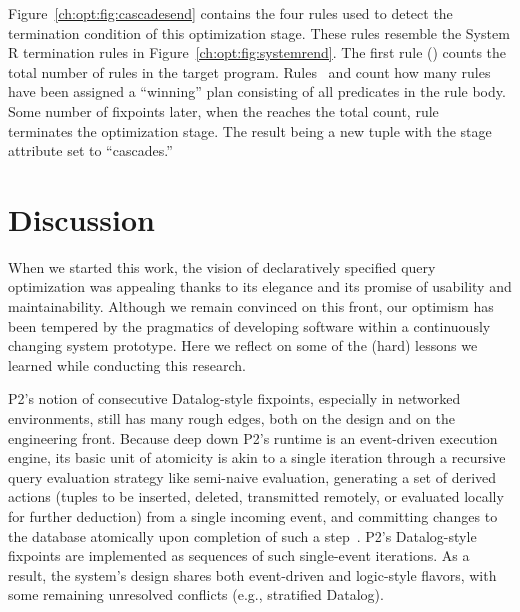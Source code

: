Figure~\ref{ch:opt:fig:cascadesend} contains the four rules used to detect the
termination condition of this optimization stage.  These rules resemble the
System R termination rules in Figure~\ref{ch:opt:fig:systemrend}.  The first
rule () counts the total number of rules in the target program.
Rules~ and  count how many rules have been assigned a
``winning'' plan consisting of all predicates in the rule body.  Some number of
fixpoints later, when the  reaches the total 
count, rule~ terminates the optimization stage.  The result being a
new  tuple with the stage attribute set to ``cascades.''

\section{Discussion}
\label{ch:opt:sec:discussion}

When we started this work, the vision of declaratively specified query
optimization was appealing thanks to its elegance and its promise of usability
and maintainability.  Although we remain convinced on this front, our optimism
has been tempered by the pragmatics of developing software within a
continuously changing system prototype.  Here we reflect on some of the (hard)
lessons we learned while conducting this research.

P2's notion of consecutive Datalog-style fixpoints, especially in networked
environments, still has many rough edges, both on the design and on the
engineering front.  Because deep down P2's runtime is an event-driven execution
engine, its basic unit of atomicity is akin to a single iteration through a
recursive query evaluation strategy like semi-naive evaluation, generating a
set of derived actions (tuples to be inserted, deleted, transmitted remotely,
or evaluated locally for further deduction) from a single incoming event, and
committing changes to the database atomically upon completion of such a
step~\cite{LuThesis}.  P2's Datalog-style fixpoints are implemented as
sequences of such single-event iterations.  As a result, the system's design
shares both event-driven and logic-style flavors, with some remaining
unresolved conflicts (e.g., stratified Datalog).


